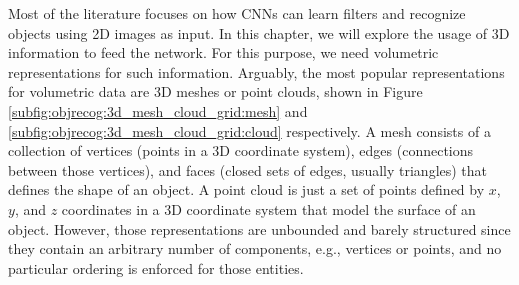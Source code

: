 Most of the literature focuses on how \acp{CNN} can learn filters and recognize objects using \acs{2D} images as input. In this chapter, we will explore the usage of \acs{3D} information to feed the network. For this purpose, we need volumetric representations for such information. Arguably, the most popular representations for volumetric data are \acs{3D} meshes or point clouds, shown in Figure \ref{subfig:objrecog:3d_mesh_cloud_grid:mesh} and \ref{subfig:objrecog:3d_mesh_cloud_grid:cloud} respectively. A mesh consists of a collection of vertices (points in a \ac{3D} coordinate system), edges (connections between those vertices), and faces (closed sets of edges, usually triangles) that defines the shape of an object. A point cloud is just a set of points defined by $x$, $y$, and $z$ coordinates in a \acl{3D} coordinate system that model the surface of an object. However, those representations are unbounded and barely structured since they contain an arbitrary number of components, e.g., vertices or points, and no particular ordering is enforced for those entities.


